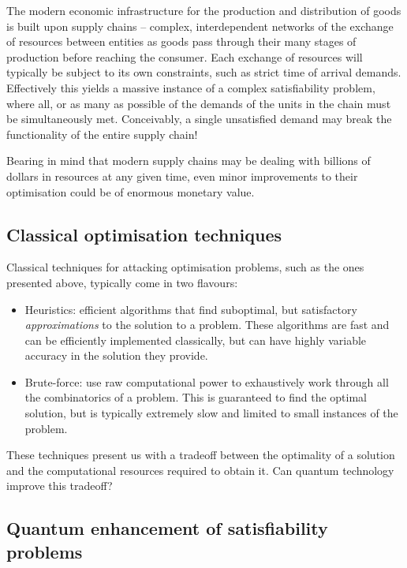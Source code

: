 The modern economic infrastructure for the production and distribution of goods is built upon supply chains -- complex, interdependent networks of the exchange of resources between entities as goods pass through their many stages of production before reaching the consumer. Each exchange of resources will typically be subject to its own constraints, such as strict time of arrival demands. Effectively this yields a massive instance of a complex satisfiability problem, where all, or as many as possible of the demands of the units in the chain must be simultaneously met. Conceivably, a single unsatisfied demand may break the functionality of the entire supply chain! 

Bearing in mind that modern supply chains may be dealing with billions of dollars in resources at any given time, even minor improvements to their optimisation could be of enormous monetary value.

\subsection{Classical optimisation techniques}

Classical techniques for attacking optimisation problems, such as the ones presented above, typically come in two flavours:
\begin{itemize}
	\item Heuristics: efficient algorithms that find suboptimal, but satisfactory \textit{approximations} to the solution to a problem. These algorithms are fast and can be efficiently implemented classically, but can have highly variable accuracy in the solution they provide.
	\item Brute-force: use raw computational power to exhaustively work through all the combinatorics of a problem. This is guaranteed to find the optimal solution, but is typically extremely slow and limited to small instances of the problem.
\end{itemize}

These techniques present us with a tradeoff between the optimality of a solution and the computational resources required to obtain it. Can quantum technology improve this tradeoff?

\subsection{Quantum enhancement of satisfiability problems}

